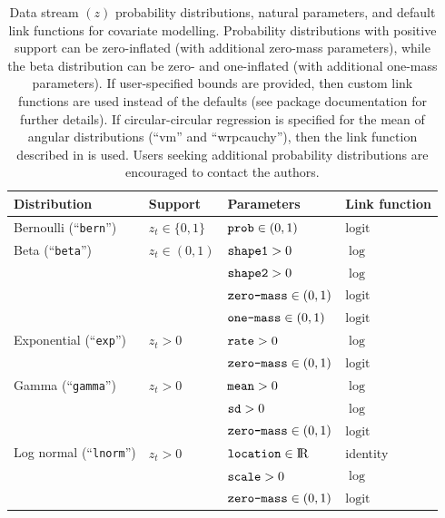 \documentclass[12pt]{article}\usepackage[]{graphicx}\usepackage[]{color}
\begin{document}
\begin{table}
  \caption{\label{tab:pdfs} Data stream $(z)$ probability distributions, natural parameters, and default link functions for covariate modelling. Probability distributions with positive support can be zero-inflated (with additional zero-mass parameters), while the beta distribution can be zero- and one-inflated (with additional one-mass parameters). If user-specified bounds are provided, then custom link functions are used instead of the defaults (see package documentation for further details). If circular-circular regression is specified for the mean of angular distributions (``vm'' and ``wrpcauchy''), then the link function described in \cite{DuchesneEtAl2015} is used. Users seeking additional probability distributions are encouraged to contact the authors.}
  \begin{tabular}{llll}
  \toprule
  Distribution & Support & Parameters & Link function \tabularnewline
  \midrule
  Bernoulli (``\verb|bern|'')          & $z_t\in\{0,1\}$          & $\verb|prob|\in(0,1)$            &  $\text{logit}$ \tabularnewline  
  Beta (``\verb|beta|'')               & $z_t\in(0,1)$            & $\verb|shape1|>0$                &  $\log$ \tabularnewline  
                                       &                          & $\verb|shape2|>0$                &  $\log$ \tabularnewline
                                       &                          & $\verb|zero-mass|\in(0,1)$       &  $\text{logit}$ \tabularnewline 
                                       &                          & $\verb|one-mass|\in(0,1)$        &  $\text{logit}$ \tabularnewline 
  Exponential (``\verb|exp|'')         & $z_t>0$                  & $\verb|rate|>0$                  &  $\log$ \tabularnewline  
                                       &                          & $\verb|zero-mass|\in(0,1)$       &  $\text{logit}$ \tabularnewline 
  Gamma (``\verb|gamma|'')             & $z_t>0$                  & $\verb|mean|>0$                  &  $\log$ \tabularnewline  
                                       &                          & $\verb|sd|>0$                    &  $\log$ \tabularnewline  
                                       &                          & $\verb|zero-mass|\in(0,1)$       &  $\text{logit}$ \tabularnewline 
  Log normal (``\verb|lnorm|'')        & $z_t>0$                  & $\verb|location|\in{\rm I\!R}$   &  identity \tabularnewline  
                                       &                          & $\verb|scale|>0$                 &  $\log$ \tabularnewline  
                                       &                          & $\verb|zero-mass|\in(0,1)$       &  $\text{logit}$ \tabularnewline 

\end{tabular}
\end{table}
\end{document}
